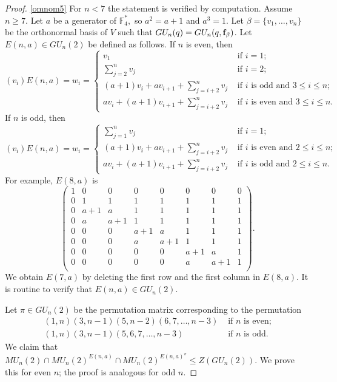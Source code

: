 \begin{proof}
\eqref{omnom5}  For $n < 7 $  the statement is verified by computation. Assume $n\ge 7.$ Let $a$ be a generator of $\mathbb{F}_4^*,$ so $a^2=a+1$ and $a^3=1.$ Let $\beta=\{v_1, \ldots, v_n\}$ be the orthonormal basis of $V$ such that $GU_n(q)=GU_n(q, {\bf f}_{\beta})$. Let $E(n,a) \in GU_n(2)$ be defined as follows. If $n$ is even, then
\begin{equation*}
(v_i)E(n,a)=w_i=
\begin{cases}
v_1 & \text{ if } i=1; \\
\sum_{j=2}^n v_j & \text{ if } i=2; \\
(a+1)v_i +a v_{i+1} + \sum_{j=i+2}^n v_j & \text{ if } i \text{ is odd and }3\le i\le n; \\
 a v_i +(a+1) v_{i+1} + \sum_{j=i+2}^n v_j & \text{ if } i \text{ is even and }3\le i\le n.
\end{cases}
\end{equation*}
If $n$ is odd, then 
\begin{equation*}
(v_i)E(n,a)=w_i=
\begin{cases}
\sum_{j=1}^n v_j & \text{ if } i=1; \\
(a+1)v_i +a v_{i+1} + \sum_{j=i+2}^n v_j & \text{ if } i \text{ is even and } 2\le i\le n; \\
 a v_i +(a+1) v_{i+1} + \sum_{j=i+2}^n v_j & \text{ if } i \text{ is odd and } 2\le i\le n.
\end{cases}
\end{equation*}
For example,  $E(8,a)$ is
$$
\begin{pmatrix}
1 & 0 & 0 & 0 & 0 & 0 & 0 & 0\\
0 & 1 & 1 & 1 & 1 & 1 & 1 & 1\\
0 & a+1 & a & 1 & 1 & 1 & 1 & 1\\
0 & a & a+1 & 1 & 1 & 1 & 1 & 1\\
0 & 0 & 0 & a+1 & a & 1 & 1 & 1\\
0 & 0 & 0 & a & a+1 & 1 & 1 & 1\\
0 & 0 & 0 & 0 & 0 & a+1 & a & 1\\
0 & 0 & 0 & 0 & 0 & a & a+1 & 1\\
\end{pmatrix}.$$ We obtain $E(7,a)$ by deleting the first row and the first column in $E(8,a).$ It is routine to verify that $E(n,a) \in GU_n(2).$

 Let $\pi \in GU_n(2)$ be the permutation matrix corresponding to the permutation
\begin{align*}
(1,n)(3,n-1)(5,n-2)(6, 7, \ldots, n-3) & \text{ if } n \text{ is even;}\\
(1,n)(3,n-1)(5,6, 7, \ldots, n-3) & \text{ if } n \text{ is odd.}
\end{align*}
We claim that $MU_n(2) \cap MU_n(2)^{E(n,a)} \cap MU_n(2)^{E(n,a)^{\pi}}\le Z(GU_n(2)).$ We prove this for even $n$; the proof is analogous for odd $n$. 



\end{proof}
